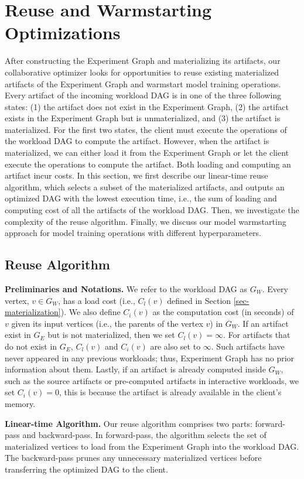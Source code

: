 \section{Reuse and Warmstarting Optimizations}\label{sec-reuse-and-warmstarting}
After constructing the Experiment Graph and materializing its artifacts, our collaborative optimizer looks for opportunities to reuse existing materialized artifacts of the Experiment Graph and warmstart model training operations.
Every artifact of the incoming workload DAG is in one of the three following states: (1) the artifact does not exist in the Experiment Graph, (2) the artifact exists in the Experiment Graph but is unmaterialized, and (3) the artifact is materialized.
For the first two states, the client must execute the operations of the workload DAG to compute the artifact.
However, when the artifact is materialized, we can either load it from the Experiment Graph or let the client execute the operations to compute the artifact.
Both loading and computing an artifact incur costs.
In this section, we first describe our linear-time reuse algorithm, which selects a subset of the materialized artifacts, and outputs an optimized DAG with the lowest execution time, i.e., the sum of loading and computing cost of all the artifacts of the workload DAG.
Then, we investigate the complexity of the reuse algorithm.
Finally, we discuss our model warmstarting approach for model training operations with different hyperparameters.
\subsection{Reuse Algorithm} 
\textbf{Preliminaries and Notations.} 
We refer to the workload DAG as $G_W$.
Every vertex, $v \in G_W$, has a load cost (i.e., $C_l(v)$ defined in Section \ref{sec-materialization}).
We also define $C_i(v)$ as the computation cost (in seconds) of $v$ given its input vertices (i.e., the parents of the vertex $v$) in $G_W$.
If an artifact exist in $G_E$ but is not materialized, then we set $C_l(v)=\infty$.
For artifacts that do not exist in $G_E$, $C_l(v)$ and $C_i(v)$ are also set to $\infty$.
Such artifacts have never appeared in any previous workloads; thus, Experiment Graph has no prior information about them.
Lastly, if an artifact is already computed inside $G_W$, such as the source artifacts or pre-computed artifacts in interactive workloads, we set $C_i(v)=0$, this is because the artifact is already available in the client's memory.

\textbf{Linear-time Algorithm.}
Our reuse algorithm comprises two parts: forward-pass and backward-pass.
In forward-pass, the algorithm selects the set of materialized vertices to load from the Experiment Graph into the workload DAG.
The backward-pass prunes any unnecessary materialized vertices before transferring the optimized DAG to the client.

